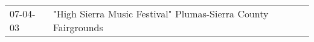 \begin{supertabular}{p{0.07\textwidth}p{0.23\textwidth}}
 07-04-03 &  "High Sierra Music Festival" Plumas-Sierra County Fairgrounds \\
\end{supertabular}
